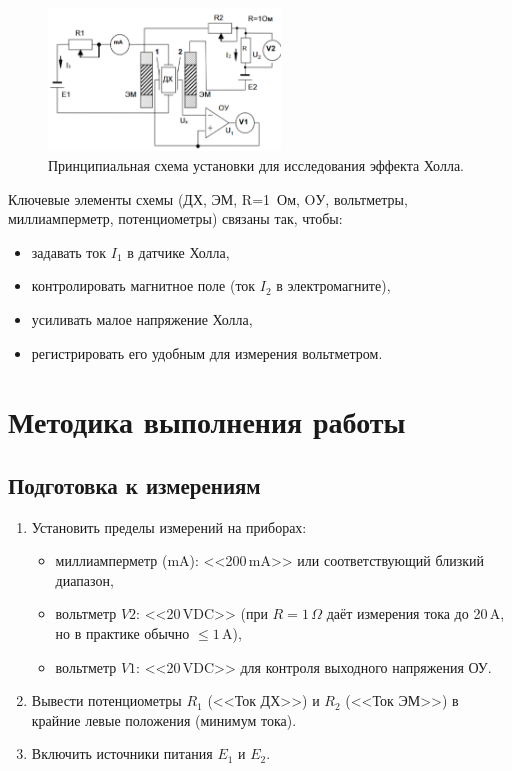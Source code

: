 \documentclass[12pt,a4paper]{article}
\begin{document}
\begin{figure}[h!]
    \centering
    \includegraphics[width=0.55\textwidth]{hall_scheme.png}
    \caption{Принципиальная схема установки для исследования эффекта Холла.}
    \label{fig:scheme}
\end{figure}

Ключевые элементы схемы (ДХ, ЭМ, R=1~Ом, OУ, вольтметры, миллиамперметр, потенциометры) связаны так, чтобы:
\begin{itemize}
    \item задавать ток $I_1$ в датчике Холла,
    \item контролировать магнитное поле (ток $I_2$ в электромагните),
    \item усиливать малое напряжение Холла,
    \item регистрировать его удобным для измерения вольтметром.
\end{itemize}

\section{Методика выполнения работы}

\subsection{Подготовка к измерениям}

\begin{enumerate}
    \item Установить пределы измерений на приборах:
          \begin{itemize}
              \item миллиамперметр (mA): <<200\,mA>> или соответствующий близкий диапазон,
              \item вольтметр $V2$: <<20\,VDC>> (при $R=1\,\Omega$ даёт измерения тока до 20\,A, но в практике обычно $\leq 1$\,A),
              \item вольтметр $V1$: <<20\,VDC>> для контроля выходного напряжения ОУ.
          \end{itemize}
    \item Вывести потенциометры $R_1$ (<<Ток ДХ>>) и $R_2$ (<<Ток ЭМ>>) в крайние левые положения (минимум тока).
    \item Включить источники питания $E_1$ и $E_2$.
\end{enumerate}
\end{document}
